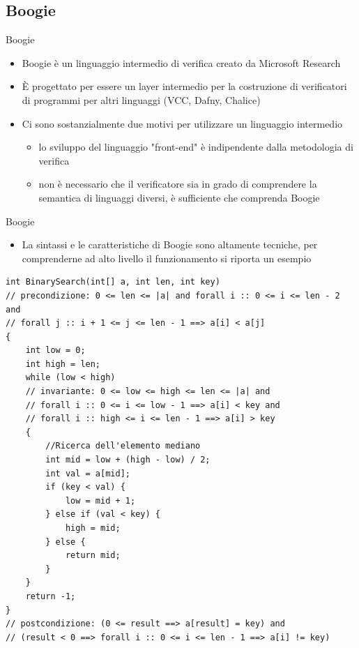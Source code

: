 \documentclass[]{beamer}
\begin{document}
\subsection{Boogie}
\begin{frame}{Boogie}
\begin{itemize}
    \item Boogie è un linguaggio intermedio di verifica creato da Microsoft Research
    \item È progettato per essere un layer intermedio per la costruzione di verificatori di programmi per altri linguaggi (VCC, Dafny, Chalice)
    \item Ci sono sostanzialmente due motivi per utilizzare un linguaggio intermedio\begin{itemize}
        \item lo sviluppo del linguaggio "front-end" è indipendente dalla metodologia di verifica
        \item non è necessario che il verificatore sia in grado di comprendere la semantica di linguaggi diversi, è sufficiente che comprenda Boogie
    \end{itemize}
\end{itemize}
\end{frame}

\begin{frame}[containsverbatim]{Boogie}
    \begin{itemize}
        \item La sintassi e le caratteristiche di Boogie sono altamente tecniche, per comprenderne ad alto livello il funzionamento si riporta un esempio \cite{SMT_applications}
    \end{itemize}
\lstset{linewidth=11cm}    
\begin{lstlisting}[basicstyle=\tiny]
int BinarySearch(int[] a, int len, int key)
// precondizione: 0 <= len <= |a| and forall i :: 0 <= i <= len - 2 and
// forall j :: i + 1 <= j <= len - 1 ==> a[i] < a[j]
{
    int low = 0;
    int high = len;
    while (low < high)
    // invariante: 0 <= low <= high <= len <= |a| and
    // forall i :: 0 <= i <= low - 1 ==> a[i] < key and
    // forall i :: high <= i <= len - 1 ==> a[i] > key
    { 
        //Ricerca dell'elemento mediano
        int mid = low + (high - low) / 2;
        int val = a[mid];
        if (key < val) {
            low = mid + 1;
        } else if (val < key) {
            high = mid;
        } else {
            return mid;
        }
    }
    return -1;
}
// postcondizione: (0 <= result ==> a[result] = key) and 
// (result < 0 ==> forall i :: 0 <= i <= len - 1 ==> a[i] != key)
\end{lstlisting}
\end{frame}
\end{document}
